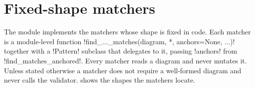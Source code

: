 \section{Fixed-shape matchers}\label{sec:rewriting-fixed}

The module  implements the matchers whose shape is fixed in code.
Each matcher is a module-level function \py!find_..._matches(diagram, *, anchors=None, ...)!
together with a \py!Pattern! subclass that delegates to it, passing \py!anchors! from
\py!find_matches_anchored!. Every matcher reads a diagram and never mutates it. Unless stated
otherwise a matcher does not require a well-formed diagram and never calls the validator.
 shows the shapes the matchers locate.


